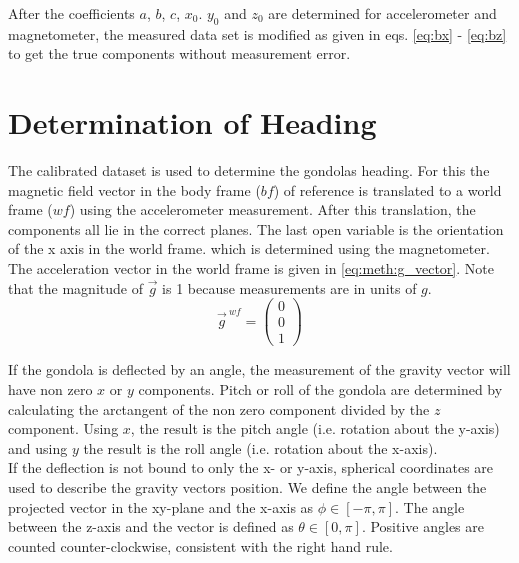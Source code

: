 After the coefficients $a$, $b$, $c$, $x_0$. $y_0$ and $z_0$ are determined for accelerometer and magnetometer, the measured data set is modified as given in eqs. \eqref{eq:bx} - \eqref{eq:bz} to get the true components without measurement error.



\section{Determination of Heading \label{sec:meth:determination_heading}}
The calibrated dataset is used to determine the gondolas heading. For this the magnetic field vector in the body frame ($bf$) of reference is translated to a world frame ($wf$) using the accelerometer measurement. After this translation, the components all lie in the correct planes. The last open variable is the orientation of the x axis in the world frame. which is determined using the magnetometer. The acceleration vector in the world frame is given in \eqref{eq:meth:g_vector}. Note that the magnitude of $\vec{g}$ is 1 because measurements are in units of $g$.
\begin{equation}
    \vec{g}^{\ wf}=\begin{pmatrix} 0 \\ 0 \\ 1 \end{pmatrix} \label{eq:meth:g_vector}
\end{equation}

If the gondola is deflected by an angle, the measurement of the gravity vector will have non zero $x$ or $y$ components. Pitch or roll of the gondola are determined by calculating the arctangent of the non zero component divided by the $z$ component. Using $x$, the result is the pitch angle (i.e. rotation about the y-axis) and using $y$ the result is the roll angle (i.e. rotation about the x-axis).\\
If the deflection is not bound to only the x- or y-axis, spherical coordinates are used to describe the gravity vectors position. We define the angle between the projected vector in the xy-plane and the x-axis as $\phi\in[-\pi,\pi]$. The angle between the z-axis and the vector is defined as $\theta\in[0,\pi]$. Positive angles are counted counter-clockwise, consistent with the right hand rule.

